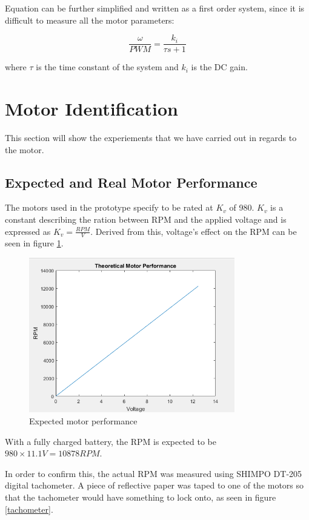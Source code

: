 Equation \label{modelm} can be further simplified and written as a first order system, since it is difficult to measure all the motor parameters:

\begin{equation}
   \frac{\omega}{PWM}=\frac{k_{i}}{\tau s+1}
\end{equation}


where $\tau$ is the time constant of the system and $k_{i}$ is the DC gain. 

\section{Motor Identification}
This section will show the experiements that we have carried out in regards to the motor.

\subsection{Expected and Real Motor Performance}

The motors used in the prototype specify to be rated at $K_v$ of 980. $K_v$ is a constant describing the ration between RPM and the applied voltage and is expressed as $K_v = \frac{RPM}{V}$. Derived from this, voltage's effect on the RPM can be seen in figure \ref{KvPlot}.
\begin{figure}[H]
  \centering
    \includegraphics[width=0.8\textwidth]{images/KvPlot.png}
	\caption{Expected motor performance}
	\label{KvPlot}
\end{figure}
With a fully charged battery, the RPM is expected to be $980\times 11.1V = 10878 RPM$.

In order to confirm this, the actual RPM was measured using SHIMPO DT-205 digital tachometer. A piece of reflective paper was taped to one of the motors so that the tachometer would have something to lock onto, as seen in figure \ref{tachometer}.

